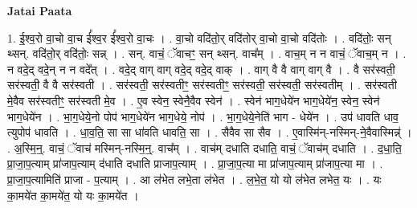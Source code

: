 \documentclass[17pt]{extarticle}
\begin{document}
\textbf{Jatai Paata} \newline

1. ई॒श्व॒रो वा॒चो वा॒च ई᳚श्व॒र ई᳚श्व॒रो वा॒चः । . वा॒चो वदि॑तो॒र् वदि॑तोर् वा॒चो वा॒चो वदि॑तोः । . वदि॑तोः॒ सन् थ्सन्. वदि॑तो॒र् वदि॑तोः॒ सन्न् । . सन्. वाचं॒ ॅवाचꣳ॒॒ सन् थ्सन्. वाच᳚म् । . वाच॒म् न न वाचं॒ ॅवाच॒म् न । . न वदे॒द् वदे॒न् न न वदे᳚त् । . वदे॒द् वाग् वाग् वदे॒द् वदे॒द् वाक् । . वाग् वै वै वाग् वाग् वै । . वै सर॑स्वती॒ सर॑स्वती॒ वै वै सर॑स्वती । . सर॑स्वती॒ सर॑स्वतीꣳ॒॒ सर॑स्वतीꣳ॒॒ सर॑स्वती॒ सर॑स्वती॒ सर॑स्वतीम् । . सर॑स्वती मे॒वैव सर॑स्वतीꣳ॒॒ सर॑स्वती मे॒व । . ए॒व स्वेन॒ स्वेनै॒वैव स्वेन॑ । . स्वेन॑ भाग॒धेये॑न भाग॒धेये॑न॒ स्वेन॒ स्वेन॑ भाग॒धेये॑न । . भा॒ग॒धेये॒नो पोप॑ भाग॒धेये॑न भाग॒धेये॒ नोप॑ । . भा॒ग॒धेये॒नेति॑ भाग - धेये॑न । . उप॑ धावति धाव॒ त्युपोप॑ धावति । . धा॒व॒ति॒ सा सा धा॑वति धावति॒ सा । . सैवैव सा सैव । . ए॒वास्मि॑न्-नस्मिन्-ने॒वैवास्मिन्न्॑ । . अ॒स्मि॒न्॒. वाचं॒ ॅवाच॑ मस्मिन्-नस्मि॒न्॒. वाच᳚म् । . वाच॑म् दधाति दधाति॒ वाचं॒ ॅवाच॑म् दधाति । . द॒धा॒ति॒ प्रा॒जा॒प॒त्याम् प्रा॑जाप॒त्याम् द॑धाति दधाति प्राजाप॒त्याम् । . प्रा॒जा॒प॒त्या मा प्रा॑जाप॒त्याम् प्रा॑जाप॒त्या मा । . प्रा॒जा॒प॒त्यामिति॑ प्राजा - प॒त्याम् । . आ ल॑भेत लभे॒ता ल॑भेत । . ल॒भे॒त॒ यो यो ल॑भेत लभेत॒ यः । . यः का॒मये॑त का॒मये॑त॒ यो यः का॒मये॑त । \newline
\end{document}
